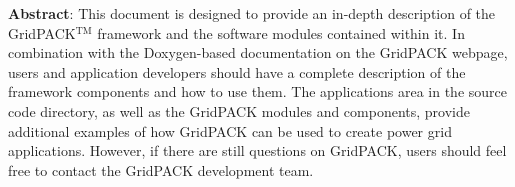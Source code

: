 \textbf{Abstract}:
This document is designed to provide an in-depth description of the GridPACK$\mathrm{{}^{TM}}$ framework and the software modules contained within it. In combination with the Doxygen-based documentation on the GridPACK webpage, users and application developers should have a complete description of the framework components and how to use them. The applications area in the source code directory, as well as the GridPACK modules and components, provide additional examples of how GridPACK can be used to create power grid applications. However, if there are still questions on GridPACK, users should feel free to contact the GridPACK development team.
\eject 
